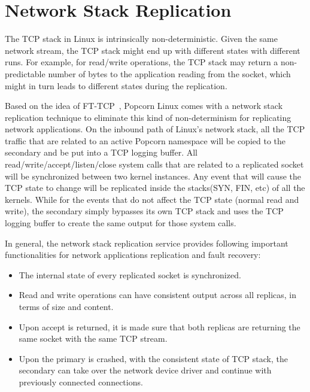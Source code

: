 \section{Network Stack Replication}
The TCP stack in Linux is intrinsically non-deterministic. Given the same network stream, the TCP stack might end up with different states with different runs. For example, for read/write operations, the TCP stack may return a non-predictable number of bytes to the application reading from the socket, which might in turn leads to different states during the replication.

Based on the idea of FT-TCP~\cite{zagorodnov2009practical}, Popcorn Linux comes with a network stack replication technique to eliminate this kind of non-determinism for replicating network applications. On the inbound path of Linux's network stack, all the TCP traffic that are related to an active Popcorn namespace will be copied to the secondary and be put into a TCP logging buffer. All read/write/accept/listen/close system calls that are related to a replicated socket will be synchronized between two kernel instances. Any event that will cause the TCP state to change will be replicated inside the stacks(SYN, FIN, etc) of all the kernels. While for the events that do not affect the TCP state (normal read and write), the secondary simply bypasses its own TCP stack and uses the TCP logging buffer to create the same output for those system calls.

In general, the network stack replication service provides following important functionalities for network applications replication and fault recovery:
\begin{itemize}
\item The internal state of every replicated socket is synchronized.
\item Read and write operations can have consistent output across all replicas, in terms of size and content.
\item Upon accept is returned, it is made sure that both replicas are returning the same socket with the same TCP stream.
\item Upon the primary is crashed, with the consistent state of TCP stack, the secondary can take over the network device driver and continue with previously connected connections.
\end{itemize}